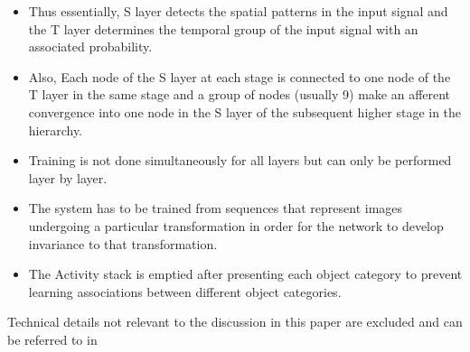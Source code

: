 \documentclass[12pt,twoside]{article}
\theoremstyle{plain}
\theoremstyle{definition}
\theoremstyle{remark}
\begin{document}
\begin{itemize}
\item Thus essentially, S layer detects the spatial patterns in the input signal and the T layer determines the temporal group of the input signal with an associated probability. 
\item Also, Each node\cite{MarkusLessmann2014} of the S layer at each stage is connected to one node of the T layer in the same stage and a group of nodes (usually 9) make an afferent convergence into one node in the S layer of the subsequent higher stage in the hierarchy. 
\item Training is not done simultaneously for all layers but can only be performed layer by layer.
\item The system has to be trained from sequences that represent images undergoing a particular transformation in order for the network to develop invariance to that transformation. 
\item The Activity stack is emptied after presenting each object category to prevent learning associations between different object categories.
\end{itemize} 	
Technical details not relevant to the discussion in this paper are excluded and can be referred to in \cite{MarkusLessmann2014}
\end{document}
